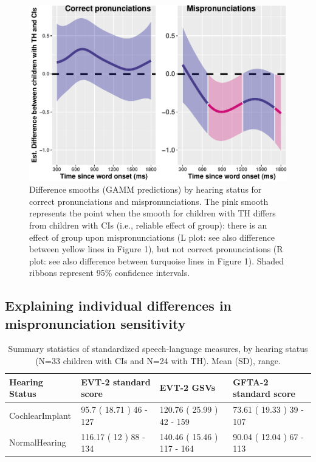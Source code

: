 \documentclass[
]{article}
\begin{document}
\begin{figure}
\centering
\includegraphics{2_modeling_files/figure-latex/real-mp-facet-plot-1.pdf}
\caption{\label{fig:real-mp-facet-plot}Difference smooths (GAMM predictions) by hearing status for correct pronunciations and mispronunciations. The pink smooth represents the point when the smooth for children with TH differs from children with CIs (i.e., reliable effect of group): there is an effect of group upon mispronunciations (L plot: see also difference between yellow lines in Figure 1), but not correct pronunciations (R plot: see also difference between turquoise lines in Figure 1). Shaded ribbons represent 95\% confidence intervals.}
\end{figure}

\hypertarget{explaining-individual-differences-in-mispronunciation-sensitivity}{%
\subsection{Explaining individual differences in mispronunciation sensitivity}\label{explaining-individual-differences-in-mispronunciation-sensitivity}}

\begin{table}[!h]

\caption{\label{tab:stan-meas-table}Summary statistics of standardized speech-language measures, by hearing status (N=33 children with CIs and N=24 with TH). Mean (SD), range.}
\centering
\begin{tabular}[t]{llll}
\toprule
Hearing Status & EVT-2 standard score & EVT-2 GSVs & GFTA-2 standard score\\
\midrule
CochlearImplant & 95.7 ( 18.71 ) 46 - 127 & 120.76 ( 25.99 ) 42 - 159 & 73.61 ( 19.33 ) 39 - 107\\
NormalHearing & 116.17 ( 12 ) 88 - 134 & 140.46 ( 15.46 ) 117 - 164 & 90.04 ( 12.04 ) 67 - 113\\
\bottomrule
\end{tabular}
\end{table}
\end{document}
